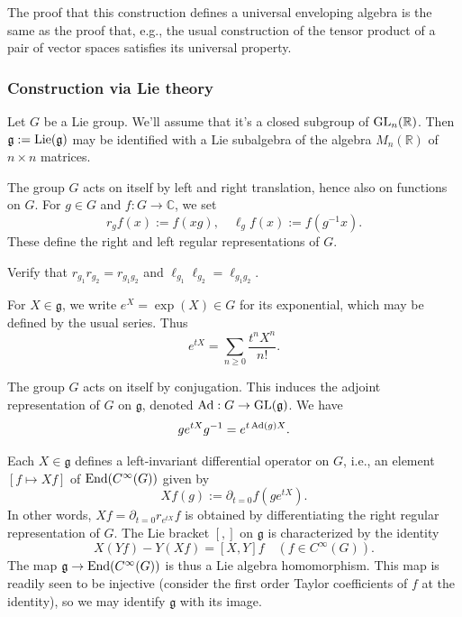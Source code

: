\documentclass[reqno]{amsart} 
\begin{document}
The proof that this construction defines a universal enveloping algebra is the same as the proof that, e.g., the usual construction of the tensor product of a pair of vector spaces satisfies its universal property.

\subsubsection{Construction via Lie theory}\label{sec:construction-via-lie}
Let $G$ be a Lie group.  We'll assume that it's a closed subgroup of $\operatorname{GL}_n(\mathbb{R})$.  Then $\mathfrak{g} := \operatorname{Lie}(\mathfrak{g})$ may be identified with a Lie subalgebra of the algebra $M_n(\mathbb{R})$ of $n \times n$ matrices.

The group $G$ acts on itself by left and right translation, hence also on functions on $G$.  For $g \in G$ and $f : G \rightarrow \mathbb{C}$, we set
\begin{equation*}
  r_g f(x) := f(x g), \quad \ell_g f(x) := f(g^{-1} x).
\end{equation*}
These define the right and left regular representations of $G$.
\begin{exercise}
  Verify that $r_{g_1} r_{g_2} = r_{g_1 g_2}$ and $\ell_{g_1} \ell_{g_2} = \ell_{g_1 g_2}$.
\end{exercise}

For $X \in \mathfrak{g}$, we write $e^X = \exp(X) \in G$ for its exponential, which may be defined by the usual series.  Thus
\begin{equation*}
  e^{t X} = \sum _{n \geq 0} \frac{t^n X^n}{n!}.
\end{equation*}

The group $G$ acts on itself by conjugation.  This induces the adjoint representation of $G$ on $\mathfrak{g}$, denoted $\operatorname{Ad} : G \rightarrow \operatorname{GL}(\mathfrak{g})$.  We have
\begin{equation*}
  g e^{t X} g^{-1} = e^{t \operatorname{Ad}(g) X}.
\end{equation*}

Each $X \in \mathfrak{g}$ defines a left-invariant differential operator on $G$, i.e., an element $[f \mapsto X f]$ of $\operatorname{End}(C^\infty(G))$ given by
\begin{equation*}
  X f(g) := \partial_{t=0} f(g e^{t X}).
\end{equation*}
In other words, $X f = \partial_{t=0} r_{e^{t X}} f$ is obtained by differentiating the right regular representation of $G$.  The Lie bracket $[,]$ on $\mathfrak{g}$ is characterized by the identity
\begin{equation}\label{eq:x-y-f}
  X (Y  f) - Y (X f) = [X,Y] f
  \quad (f \in C^\infty(G)).
\end{equation}
The map $\mathfrak{g} \rightarrow \operatorname{End}(C^\infty(G))$ is thus a Lie algebra homomorphism.  This map is readily seen to be injective (consider the first order Taylor coefficients of $f$ at the identity), so we may identify $\mathfrak{g}$ with its image.
\end{document}
